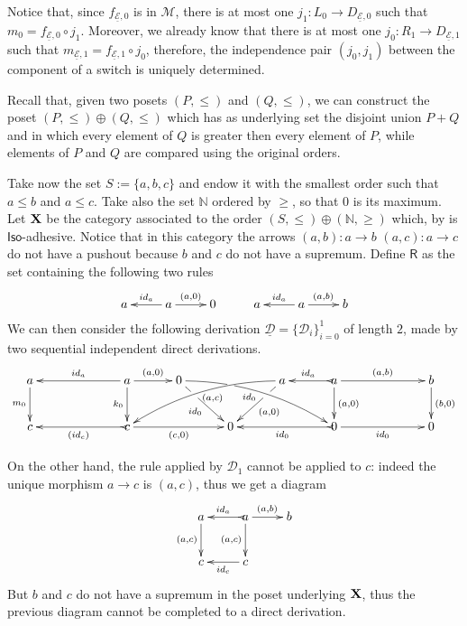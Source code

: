 \documentclass[a4paper,UKenglish,cleveref,pdftex, thm-restate,numberwithinsect]{lipics}
\newcommand{\id}[1]{\mathsf{id}_{#1}}
\def\R{\mathsf{R}}
\def\X{\textbf {\textup{X}}}
\newcommand{\dder}[1]{\mathscr{#1}}
\newcommand{\der}[1]{\underline{\dder{#1}}}
\begin{document}
\begin{remark}\label{rem:fact}
	Notice that, since $f_{\der{E}, 0}$ is in $\mathcal{M}$, there is at most one $j_1\colon L_0\to D_{\der{E},0}$ such that $m_0=f_{\der{E}, 0} \circ j_1$. Moreover, we already know that there is at most one $j_0\colon R_1\to D_{\der{E},1}$ such that $m_{\der{E},1}=f_{\der{E},1}\circ j_0$, therefore, the independence pair $(j_0,j_1)$ between the component of a switch is uniquely determined.
\end{remark}
\begin{example}\label{ex:diff1} Recall that, given two posets $(P, \leq)$ and $(Q, \leq)$, we can construct the poset $(P, \leq)\oplus(Q,\leq)$ which has as underlying set the disjoint union $P+Q$ and in which every element of $Q$ is greater then every element of $P$, while elements of $P$ and $Q$ are compared using the original orders. 
	
	Take now the set $S:=\{a,b,c\}$ and endow it with the smallest order such that $a\leq b$ and $a\leq c$. 
	Take also the set $\mathbb{N}$ ordered by $\geq$, so that $0$ is its maximum. 
	Let $\X$ be the category associated to the order $(S, \leq)\oplus (\mathbb{N}, \geq)$ which, by  is $\mathsf{Iso}$-adhesive. Notice that in this category the arrows $(a,b)\colon a\to b$ $(a,c)\colon a\to c$ do not have a pushout because $b$ and $c$ do not have a supremum.  Define $\R$ as  the set containing the following two rules
	\[\xymatrix{a & a \ar[r]^{(a, 0)} \ar[l]_{\id{a}} & 0 & a & a \ar[r]^{(a, b)} \ar[l]_{\id{a}} & b  }\]
We can then consider the following derivation $\der{D}=\{\dder{D}_i\}_{i=0}^1$ of length $2$, made by two sequential independent direct derivations.
	 	\[\xymatrix@C=30pt{a \ar[d]_{m_0}&& a \ar[d]_{k_0}\ar[ll]_{\id{a}} \ar[r]^{(a,0)} & 0 \ar@/^.35cm/[drrr]|(.315)\hole_(.45){\id{0}} \ar[dr]|(.3)\hole_{\id{0}} && a \ar@/_.35cm/[dlll]^(.45){(a,c)} \ar[dl]|(.3)\hole^{(a,0)}& a \ar[d]^{(a,0)}\ar@{>->}[l]_{\id{a}} \ar[rr]^{(a,b)} && b \ar[d]^{(b,0)}\\c && \ar@{>->}[ll]^{(\id{c})} c \ar[rr]_{(c,0)}&& 0  && \ar@{>->}[ll]^{\id{0}} 0 \ar[rr]_{\id{0}}&& 0}\]
	 	
	 	On the other hand, the rule applied by $\dder{D}_1$ cannot be applied to $c$: indeed the unique morphism $a\to c$ is $(a,c)$, thus we get a diagram
	 	\[\xymatrix{a  \ar[d]_{(a,c)}& a \ar[d]_{(a,c)}\ar@{>->}[l]_{\id{a}} \ar[r]^{(a,b)} & b \\c & c \ar[l]^{\id{c}} }\]
	 	But $b$ and $c$ do not have a supremum in the poset underlying $\X$, thus the previous diagram cannot be completed to a direct derivation.
\end{example}
\end{document}
